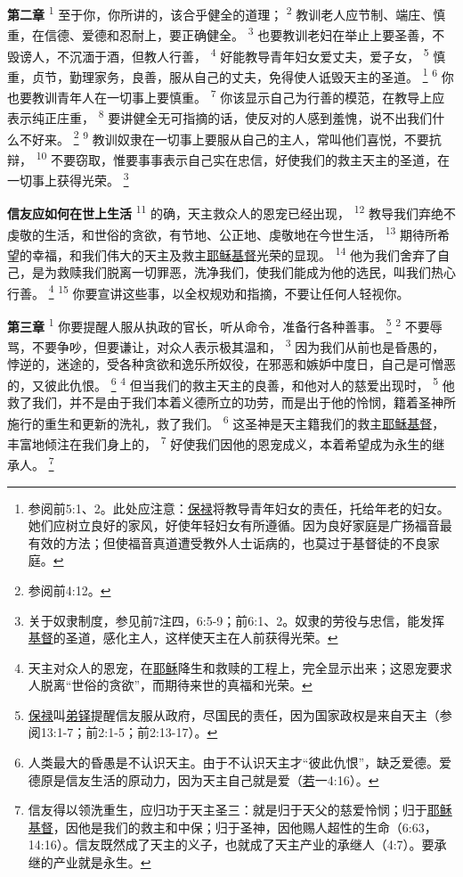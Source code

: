 \textbf{第二章\quad}
\textsuperscript{1}
至于你，你所讲的，该合乎健全的道理；
\textsuperscript{2}
教训老人应节制、端庄、慎重，在信德、爱德和忍耐上，要正确健全。
\textsuperscript{3}
也要教训老妇在举止上要圣善，不毁谤人，不沉湎于酒，但教人行善，
\textsuperscript{4}
好能教导青年妇女爱丈夫，爱子女，
\textsuperscript{5}
慎重，贞节，勤理家务，良善，服从自己的丈夫，免得使人诋毁天主的圣道。
\footnote{参阅前5:1、2。此处应注意：\uline{保禄}将教导青年妇女的责任，托给年老的妇女。她们应树立良好的家风，好使年轻妇女有所遵循。因为良好家庭是广扬福音最有效的方法；但使福音真道遭受教外人士诟病的，也莫过于基督徒的不良家庭。}
\textsuperscript{6}
你也要教训青年人在一切事上要慎重。
\textsuperscript{7}
你该显示自己为行善的模范，在教导上应表示纯正庄重，
\textsuperscript{8}
要讲健全无可指摘的话，使反对的人感到羞愧，说不出我们什么不好来。
\footnote{参阅前4:12。}
\textsuperscript{9}
教训奴隶在一切事上要服从自己的主人，常叫他们喜悦，不要抗辩，
\textsuperscript{10}
不要窃取，惟要事事表示自己实在忠信，好使我们的救主天主的圣道，在一切事上获得光荣。
\footnote{关于奴隶制度，参见前7注四，6:5-9；前6:1、2。奴隶的劳役与忠信，能发挥\uline{基督}的圣道，感化主人，这样使天主在人前获得光荣。}

\textbf{信友应如何在世上生活\quad}
\textsuperscript{11}
的确，天主救众人的恩宠已经出现，
\textsuperscript{12}
教导我们弃绝不虔敬的生活，和世俗的贪欲，有节地、公正地、虔敬地在今世生活，
\textsuperscript{13}
期待所希望的幸福，和我们伟大的天主及救主\uline{耶稣}\uline{基督}光荣的显现。
\textsuperscript{14}
他为我们舍弃了自己，是为救赎我们脱离一切罪恶，洗净我们，使我们能成为他的选民，叫我们热心行善。
\footnote{天主对众人的恩宠，在\uline{耶稣}降生和救赎的工程上，完全显示出来；这恩宠要求人脱离“世俗的贪欲”，而期待来世的真福和光荣。}
\textsuperscript{15}
你要宣讲这些事，以全权规劝和指摘，不要让任何人轻视你。

\textbf{第三章\quad}
\textsuperscript{1}
你要提醒人服从执政的官长，听从命令，准备行各种善事。
\footnote{\uline{保禄}叫\uline{弟铎}提醒信友服从政府，尽国民的责任，因为国家政权是来自天主（参阅13:1-7；前2:1-5；前2:13-17）。}
\textsuperscript{2}
不要辱骂，不要争吵，但要谦让，对众人表示极其温和，
\textsuperscript{3}
因为我们从前也是昏愚的，悖逆的，迷途的，受各种贪欲和逸乐所奴役，在邪恶和嫉妒中度日，自己是可憎恶的，又彼此仇恨。
\footnote{人类最大的昏愚是不认识天主。由于不认识天主才“彼此仇恨”，缺乏爱德。爱德原是信友生活的原动力，因为天主自己就是爱（\uline{若}一4:16）。}
\textsuperscript{4}
但当我们的救主天主的良善，和他对人的慈爱出现时，
\textsuperscript{5}
他救了我们，并不是由于我们本着义德所立的功劳，而是出于他的怜悯，籍着圣神所施行的重生和更新的洗礼，救了我们。
\textsuperscript{6}
这圣神是天主籍我们的救主\uline{耶稣}\uline{基督}，丰富地倾注在我们身上的，
\textsuperscript{7}
好使我们因他的恩宠成义，本着希望成为永生的继承人。
\footnote{信友得以领洗重生，应归功于天主圣三：就是归于天父的慈爱怜悯；归于\uline{耶稣}\uline{基督}，因他是我们的救主和中保；归于圣神，因他赐人超性的生命（6:63，14:16）。信友既然成了天主的义子，也就成了天主产业的承继人（4:7）。要承继的产业就是永生。}

